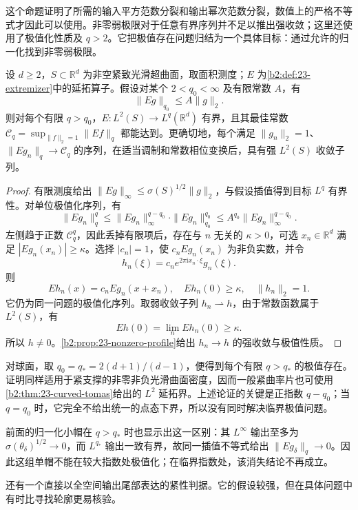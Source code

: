 这个命题证明了所需的输入平方范数分裂和输出幂次范数分裂，数值上的严格不等式才因此可以使用。非零弱极限对于任意有界序列并不足以推出强收敛；这里还使用了极值化性质及 \(q>2\)。它把极值存在问题归结为一个具体目标：通过允许的归一化找到非零弱极限。

\begin{theorem}[较大输出指数下的极值存在]\label{b2:thm:23-supercritical-extremizer}
设 \(d\geq2\)，\(S\subset\mathbb R^d\) 为非空紧致光滑超曲面，取面积测度；\(E\) 为\cref{b2:def:23-extremizer}中的延拓算子。假设对某个 \(2<q_0<\infty\) 及有限常数 \(A\)，有
\[
 \|Eg\|_{q_0}\leq A\|g\|_2.
\]
则对每个有限 \(q>q_0\)，\(E:L^2(S)\to L^q(\mathbb R^d)\) 有界，且其最佳常数
\(\mathcal C_q=\sup_{\|f\|_2=1}\|Ef\|_q\)
都能达到。更确切地，每个满足 \(\|g_n\|_2=1\)、\(\|Eg_n\|_q\to\mathcal C_q\) 的序列，在适当调制和常数相位变换后，具有强 \(L^2(S)\) 收敛子列。
\end{theorem}
\begin{proof}
有限测度给出 \(\|Eg\|_\infty\leq\sigma(S)^{1/2}\|g\|_2\)，与假设插值得到目标 \(L^q\) 有界性。对单位极值化序列，有
\[
 \|Eg_n\|_q^q
 \leq\|Eg_n\|_\infty^{q-q_0}\cdot\|Eg_n\|_{q_0}^{q_0}
 \leq A^{q_0}\|Eg_n\|_\infty^{q-q_0}.
\]
左侧趋于正数 \(\mathcal C_q^q\)，因此丢掉有限项后，存在与 \(n\) 无关的 \(\kappa>0\)，可选 \(x_n\in\mathbb R^d\) 满足 \(|Eg_n(x_n)|\geq\kappa\)。选择 \(|c_n|=1\)，使 \(c_nEg_n(x_n)\) 为非负实数，并令
\[
 h_n(\xi)=c_ne^{2\pi\mathrm i x_n\cdot\xi}g_n(\xi).
\]
则
\[
 Eh_n(x)=c_nEg_n(x+x_n),\quad
 Eh_n(0)\geq\kappa,\quad \|h_n\|_2=1.
\]
它仍为同一问题的极值化序列。取弱收敛子列 \(h_n\rightharpoonup h\)，由于常数函数属于 \(L^2(S)\)，有
\[
 Eh(0)=\lim_n Eh_n(0)\geq\kappa.
\]
所以 \(h\neq0\)。\cref{b2:prop:23-nonzero-profile}给出 \(h_n\to h\) 的强收敛与极值性质。
\end{proof}

对球面，取 \(q_0=q_*=2(d+1)/(d-1)\)，便得到每个有限 \(q>q_*\) 的极值存在。证明同样适用于紧支撑的非零非负光滑曲面密度，因而一般紧曲率片也可使用\cref{b2:thm:23-curved-tomas}给出的 \(L^2\) 延拓界。上述论证的关键是正指数 \(q-q_0\)；当 \(q=q_0\) 时，它完全不给出统一的点态下界，所以没有同时解决临界极值问题。

\ProseParagraphBreak
前面的归一化小帽在 \(q>q_*\) 时也显示出这一区别：其 \(L^\infty\) 输出至多为 \(\sigma(\theta_\delta)^{1/2}\to0\)，而 \(L^{q_*}\) 输出一致有界，故同一插值不等式给出 \(\|Eg_\delta\|_q\to0\)。因此这组单帽不能在较大指数处极值化；在临界指数处，该消失结论不再成立。

还有一个直接以全空间输出尾部表达的紧性判据。它的假设较强，但在具体问题中有时比寻找轮廓更易核验。

